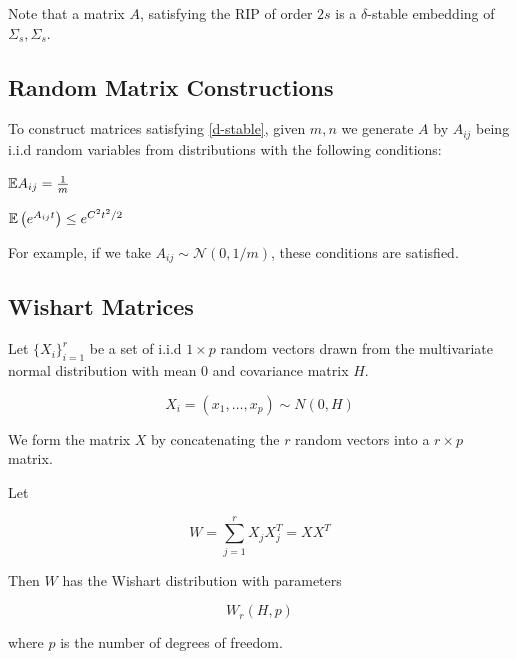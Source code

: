 \documentclass{article}
\begin{document}
\begin{remark}
Note that a matrix \(A\), satisfying the RIP of order \(2s\) is a \(\delta\)-stable embedding of \(\Sigma_s, \Sigma_s\). 
\end{remark}

\subsection{Random Matrix Constructions} \label{sec:mtx-contruction}

To construct matrices satisfying \ref{d-stable}, given \(m, n\) we generate \(A\) by \(A_{ij}\) being i.i.d random variables from distributions with the following conditions:

\begin{condition}
\({\mathbb{E}} A_{ij} = \frac{1}{m}\)
\end{condition}

\begin{condition}
\({\mathbb{E}}\left( e^{A_{ij}t} \right) \leq e^{C^2 t^2 /2}\)
\end{condition}

For example, if we take \(A_{ij} \sim \mathcal{N}\left(0, 1/m\right)\), these conditions are satisfied. 

\subsection{Wishart Matrices}

Let \(\{X_i\}_{i=1}^r\) be a set of i.i.d \(1 \times p\) random vectors drawn from the multivariate normal distribution with mean 0 and covariance matrix \(H\).

\begin{equation}
X_i = \left(x_1, \ldots , x_p\right) \sim N\left(0, H\right)
\end{equation}

We form the matrix \(X\) by concatenating the \(r\) random vectors into a \(r \times p\) matrix.

\begin{definition}
Let 

\begin{equation}
W = \sum_{j=1}^r X_j X_j^T =  X X^T
\end{equation}

Then \(W\) has the Wishart distribution with parameters 

\begin{equation}
W_r\left(H, p\right)
\end{equation}

where \(p\) is the number of degrees of freedom.
\end{definition}
\end{document}
